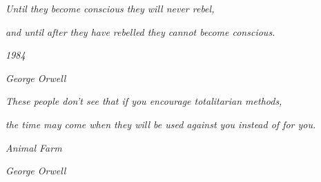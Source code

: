 %
%
%
%
%
%
%
%
%
%
%
%


\ifpdf
\ifx\tienePartesTeXiS\undefined
\else
\fi
\fi

\thispagestyle{empty}\mbox{}

\vspace*{4cm}

\small

\hfill \emph{Until they become conscious they will never rebel,}

\hfill \emph{and until after they have rebelled they cannot become conscious.}

\hfill

\hfill \emph{1984}

\hfill \emph{George Orwell}


\hfill \vspace{1cm}

\hfill \emph{These people don’t see that if you encourage totalitarian methods,}

\hfill \emph{the time may come when they will be used against you instead of for
  you.}

\hfill

\hfill \emph{Animal Farm}

\hfill \emph{George Orwell}

\newpage
\thispagestyle{empty}\mbox{}

\newpage


